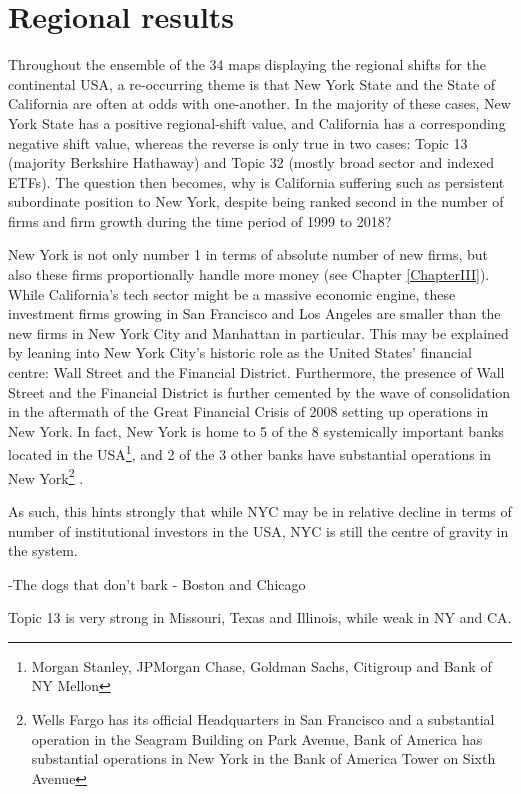 \section{Regional results}

Throughout the ensemble of the 34 maps displaying the regional shifts for the continental USA, a re-occurring theme is that New York State and the State of California are often at odds with one-another. In the majority of these cases, New York State has a positive regional-shift value, and California has a corresponding negative shift value, whereas the reverse is only true in two cases: Topic 13 (majority Berkshire Hathaway) and Topic 32 (mostly broad sector and indexed ETFs).   The question then becomes, why is California suffering such as persistent subordinate position to New York, despite being ranked second in the number of firms and firm growth during the time period of 1999 to 2018?  

New York is not only number 1 in terms of absolute number of new firms, but also these firms proportionally handle more money (see Chapter \ref{ChapterIII}).  While California's tech sector might be a massive economic engine, these investment firms growing in San Francisco and Los Angeles are smaller than the new firms in New York City and Manhattan in particular. This may be explained by leaning into New York City's historic role as the United States' financial centre: Wall Street and the Financial District.  Furthermore, the presence of Wall Street and the Financial District is further cemented by the wave of consolidation in the aftermath of the Great Financial Crisis of 2008 setting up operations in New York. In fact, New York is home to 5 of the 8 systemically important banks located in the USA\footnote{Morgan Stanley, JPMorgan Chase, Goldman Sachs, Citigroup and Bank of NY Mellon}, and 2 of the 3 other banks have substantial operations in New York\footnote{Wells Fargo has its official Headquarters in San Francisco and a substantial operation in the Seagram Building on Park Avenue,  Bank of America has substantial operations in New York in the Bank of America Tower on Sixth Avenue} \citep{FSB2019}. 

As such, this hints strongly that while NYC may be in relative decline in terms of number of institutional investors in the USA, NYC is still the centre of gravity in the system.  

-The dogs that don't bark - Boston and Chicago 

Topic 13 is very strong in Missouri, Texas and Illinois, while weak in NY and CA.



